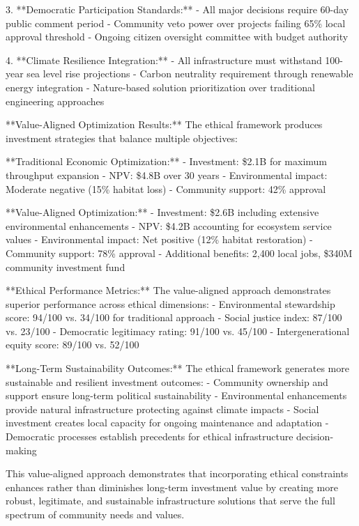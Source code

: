 \documentclass{article}
\begin{document}
3. **Democratic Participation Standards:**
   - All major decisions require 60-day public comment period
   - Community veto power over projects failing 65\% local approval threshold
   - Ongoing citizen oversight committee with budget authority

4. **Climate Resilience Integration:**
   - All infrastructure must withstand 100-year sea level rise projections
   - Carbon neutrality requirement through renewable energy integration
   - Nature-based solution prioritization over traditional engineering approaches

**Value-Aligned Optimization Results:**
The ethical framework produces investment strategies that balance multiple objectives:

**Traditional Economic Optimization:**
- Investment: \$2.1B for maximum throughput expansion
- NPV: \$4.8B over 30 years
- Environmental impact: Moderate negative (15\% habitat loss)
- Community support: 42\% approval

**Value-Aligned Optimization:**  
- Investment: \$2.6B including extensive environmental enhancements
- NPV: \$4.2B accounting for ecosystem service values
- Environmental impact: Net positive (12\% habitat restoration)
- Community support: 78\% approval
- Additional benefits: 2,400 local jobs, \$340M community investment fund

**Ethical Performance Metrics:**
The value-aligned approach demonstrates superior performance across ethical dimensions:
- Environmental stewardship score: 94/100 vs. 34/100 for traditional approach
- Social justice index: 87/100 vs. 23/100
- Democratic legitimacy rating: 91/100 vs. 45/100  
- Intergenerational equity score: 89/100 vs. 52/100

**Long-Term Sustainability Outcomes:**
The ethical framework generates more sustainable and resilient investment outcomes:
- Community ownership and support ensure long-term political sustainability
- Environmental enhancements provide natural infrastructure protecting against climate impacts
- Social investment creates local capacity for ongoing maintenance and adaptation
- Democratic processes establish precedents for ethical infrastructure decision-making

This value-aligned approach demonstrates that incorporating ethical constraints enhances rather than diminishes long-term investment value by creating more robust, legitimate, and sustainable infrastructure solutions that serve the full spectrum of community needs and values.
\end{document}
